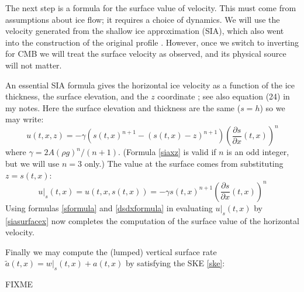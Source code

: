 \documentclass[letterpaper,final,12pt,reqno]{amsart}
\begin{document}
The next step is a formula for the surface value of velocity.  This must come from assumptions about ice flow; it requires a choice of dynamics.  We will use the velocity generated from the shallow ice approximation (SIA), which also went into the construction of the original profile \cite[section 5.3]{vanderVeen2013}.  However, once we switch to inverting for CMB we will treat the surface velocity as observed, and its physical source will not matter.

An essential SIA formula gives the horizontal ice velocity as a function of the ice thickness, the surface elevation, and the $z$ coordinate \cite{GreveBlatter2009,vanderVeen2013}; see also equation (24) in my notes.  Here the surface elevation and thickness are the same ($s=h$) so we may write:
\begin{equation}
u(t,x,z) = - \gamma \left(s(t,x)^{n+1} - (s(t,x)-z)^{n+1}\right) \left(\frac{\partial s}{\partial x}(t,x)\right)^n \label{siaxz}
\end{equation}
where $\gamma = 2 A (\rho g)^n / (n+1)$.  (Formula \eqref{siaxz} is valid if $n$ is an odd integer, but we will use $n=3$ only.)  The value at the surface comes from substituting $z=s(t,x)$:
\begin{equation}
u|_s(t,x) = u(t,x,s(t,x)) = - \gamma s(t,x)^{n+1} \left(\frac{\partial s}{\partial x}(t,x)\right)^n \label{siasurfacex}
\end{equation}
Using formulas \eqref{sformula} and \eqref{dsdxformula} in evaluating $u|_s(t,x)$ by \eqref{siasurfacex} now completes the computation of the surface value of the horizontal velocity.

Finally we may compute the (lumped) vertical surface rate $\tilde a(t,x) = w|_s(t,x) + a(t,x)$ by satisfying the SKE \eqref{ske}:

  FIXME

\small
\bigskip


\end{document}

